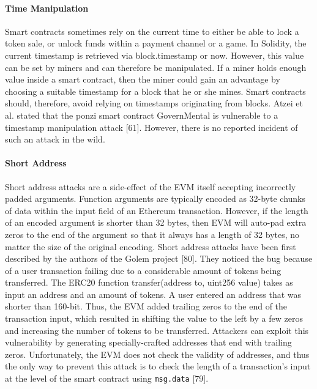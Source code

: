         \paragraph{Time Manipulation}
            Smart contracts sometimes rely on the current time to either be able to lock a token sale, or unlock funds within a payment channel or a game.
            In Solidity, the current timestamp is retrieved via block.timestamp or now.
            However, this value can be set by miners and can therefore be manipulated.
            If a miner holds enough value inside a smart contract, then the miner could gain an advantage by choosing a suitable timestamp for a block that he or she mines.
            Smart contracts should, therefore, avoid relying on timestamps originating from blocks.
            Atzei et al. stated that the ponzi smart contract GovernMental is vulnerable to a timestamp manipulation attack [61].
            However, there is no reported incident of such an attack in the wild.
        
        \paragraph{Short Address}
            Short address attacks are a side-effect of the EVM itself accepting incorrectly padded arguments. 
            Function arguments are typically encoded as 32-byte chunks of data within the input field of an Ethereum transaction.
            However, if the length of an encoded argument is shorter than 32 bytes, then EVM will auto-pad extra zeros to the end of the argument so that it always has a length of 32 bytes, no matter the size of the original encoding.
            Short address attacks have been first described by the authors of the Golem project [80].
            They noticed the bug because of a user transaction failing due to a considerable amount of tokens being transferred.
            The ERC20 function transfer(address to, uint256 value) takes as input an address and an amount of tokens.
            A user entered an address that was shorter than 160-bit.
            Thus, the EVM added trailing zeros to the end of the transaction input, which resulted in shifting the value to the left by a few zeros and increasing the number of tokens to be transferred.
            Attackers can exploit this vulnerability by generating specially-crafted addresses that end with trailing zeros.
            Unfortunately, the EVM does not check the validity of addresses, and thus the only way to prevent this attack is to check the length of a transaction's input at the level of the smart contract using \texttt{msg.data} [79].